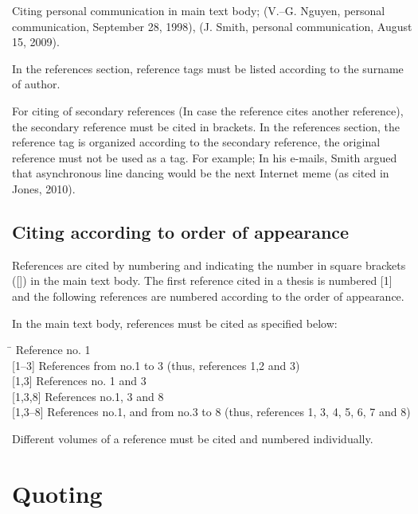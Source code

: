Citing personal communication in main text body; (V.–G. Nguyen, personal communication, September 28, 1998), (J. Smith, personal communication, August 15, 2009).

In the references section, reference tags must be listed according to the surname of author. 

For citing of secondary references (In case the reference cites another reference), the secondary reference must be cited in brackets.  In the references section, the reference tag is organized according to the secondary reference, the original reference must not be used as a tag. For example; In his e-mails, Smith argued that asynchronous line dancing would be the next Internet meme (as cited in Jones, 2010).

\subsection{Citing according to order of appearance}

References are cited by numbering and indicating the number in square brackets ([]) in the main text body. The first reference cited in a thesis is numbered [1] and the following references are numbered according to the order of appearance. 

In the main text body, references must be cited as specified below:
\vspace*{-12pt}
\begin{tabbing}
\hspace*{1.5cm}\= \kill
[1]      \> Reference no. 1\\

[1--3]   \> References from no.1 to 3 (thus, references 1,2 and 3)\\

[1,3]    \> References no. 1 and 3\\

[1,3,8]  \> References no.1, 3 and 8\\

[1,3--8] \> References no.1, and from no.3 to 8 (thus, references 1, 3, 4, 5, 6, 7 and 8)
\end{tabbing}
\vspace*{-12pt}
Different volumes of a reference must be cited and numbered individually.

\section{Quoting}

